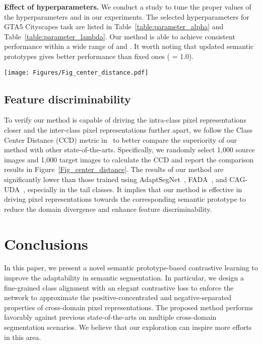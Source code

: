 \documentclass[runningheads]{llncs}
\begin{document}
{\bf Effect of hyperparameters.}
We conduct a study to tune the proper values of the hyperparameters  and  in our experiments. The selected hyperparameters for GTA5  Cityscapes task are listed in Table~\ref{table:parameter_alpha} and Table~\ref{table:parameter_lambda}. Our method is able to achieve consistent performance within a wide range of  and . It worth noting that updated semantic prototypes gives better performance than fixed ones ( = 1.0).

\begin{figure*}[t]
    \centering
    \texttt{[image: Figures/Fig\_center\_distance.pdf]}\caption{Quantitative analysis of the feature discrimination. For each class, we show the Class Center Distance (CDD) as defined in~\cite{wang2020class}, where a low CCD means the representations of the same class are densely clustered  while distances between different classes are relatively large. Our method shows a better aligned structure in class-level compared with other methods.}
    \label{Fig_center_distance}
    \vspace{-3mm}
\end{figure*}

\subsection{Feature discriminability}
To verify our method is capable of driving the intra-class pixel representations closer and the inter-class pixel representations further apart, we follow the Class Center Distance (CCD) metric in~\cite{wang2020class} to better compare the superiority of our method with other state-of-the-arts. Specifically, we randomly select 1,000 source images and 1,000 target images to calculate the CCD and report the comparison results in Figure~\ref{Fig_center_distance}. The results of our method are significantly lower than those trained using AdaptSegNet~\cite{tsai2018learning}, FADA~\cite{wang2020class}, and CAG-UDA~\cite{zhang2019category}, especially in the tail classes. It implies that our method is effective in driving pixel representations towards the corresponding semantic prototype to reduce the domain divergence and enhance feature discriminability.


\section{Conclusions}
In this paper, we present a novel semantic prototype-based contrastive learning to improve the adaptability in semantic segmentation. In particular, we design a fine-grained class alignment with an elegant contrastive loss to enforce the network to approximate the positive-concentrated and negative-separated properties of cross-domain pixel representations. 
The proposed method performs favorably against previous state-of-the-arts on multiple cross-domain segmentation scenarios. We believe that our exploration can inspire more efforts in this area.
\end{document}
